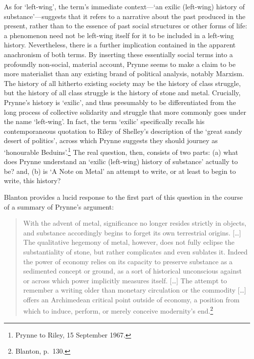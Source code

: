 \documentclass[]{article}
\begin{document}
As for `left-wing', the term's immediate context---`an exilic
(left-wing) history of substance'---suggests that it refers to a
narrative about the past produced in the present, rather than to the
essence of past social structures or other forms of life: a phenomenon
need not be left-wing itself for it to be included in a left-wing
history. Nevertheless, there is a further implication contained in the
apparent anachronism of both terms. By inserting these essentially
social terms into a profoundly non-social, material account, Prynne
seems to make a claim to be more materialist than any existing brand of
political analysis, notably Marxism. The history of all hitherto
existing society may be the history of class struggle, but the history
of all class struggle is the history of stone and metal. Crucially,
Prynne's history is `exilic', and thus presumably to be differentiated
from the long process of collective solidarity and struggle that more
commonly goes under the name `left-wing'. In fact, the term `exilic'
specifically recalls his contemporaneous quotation to Riley of Shelley's
description of the `great sandy desert of politics', across which Prynne
suggests they should journey as `honourable Beduins'.\footnote{Prynne to
  Riley, 15 September 1967.} The real question, then, consists of two
parts: (a) what does Prynne understand an `exilic (left-wing) history of
substance' actually to be? and, (b) is `A Note on Metal' an attempt to
write, or at least to begin to write, this history?

Blanton provides a lucid response to the first part of this question in
the course of a summary of Prynne's argument:

\begin{quote}
With the advent of metal, significance no longer resides strictly in
objects, and substance accordingly begins to forget its own terrestrial
origins. {[}\ldots{}{]} The qualitative hegemony of metal, however, does
not fully eclipse the substantiality of stone, but rather complicates
and even sublates it. Indeed the power of economy relies on its capacity
to preserve substance as a sedimented concept or ground, as a sort of
historical unconscious against or across which power implicitly measures
itself. {[}\ldots{}{]} The attempt to remember a writing older than
monetary circulation or the commodity {[}\ldots{}{]} offers an
Archimedean critical point outside of economy, a position from which to
induce, perform, or merely conceive modernity's end.\footnote{Blanton,
  p.~130.}
\end{quote}
\end{document}
